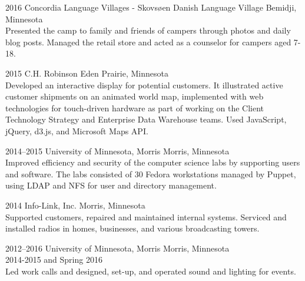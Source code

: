 \documentclass[]{cv-style} %
\begin{document}
\begin{entrylist}
\entry
{2016}
{Concordia Language Villages - Skovsøen Danish Language Village}
{Bemidji, Minnesota}
{ \\
Presented the camp to family and friends of campers through photos and daily blog posts.  Managed the retail store and acted as a counselor for campers aged 7-18.}



\entry
{2015}
{C.H. Robinson}
{Eden Prairie, Minnesota}
{ \\
Developed an interactive display for potential customers. It illustrated active customer shipments on an animated world map, implemented with web technologies for touch-driven hardware as part of working on the Client Technology Strategy and Enterprise Data Warehouse teams. Used JavaScript, jQuery, d3.js, and Microsoft Maps API.}


\entry
{2014--2015}
{University of Minnesota, Morris}
{Morris, Minnesota}
{ \\
Improved efficiency and security of the computer science labs by supporting users and software. The labs consisted of 30 Fedora workstations managed by Puppet, using LDAP and NFS for user and directory management.}


\entry
{2014}
{Info-Link, Inc.}
{Morris, Minnesota}
{ \\
Supported customers, repaired and maintained internal systems. Serviced and installed radios in homes, businesses, and various broadcasting towers.}


\entry
{2012--2016}
{University of Minnesota, Morris}
{Morris, Minnesota}
{ \\
 2014-2015 and Spring 2016 \\
Led work calls and designed, set-­up, and operated sound and lighting for events.
}


\end{entrylist}
\end{document}
